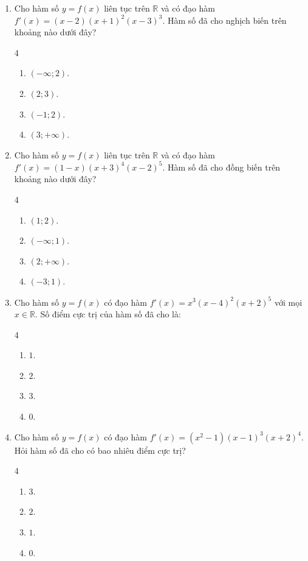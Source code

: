 \documentclass[12pt]{article}
\begin{document}
	\begin{enumerate}[label=\textbf{Câu \arabic*.}]
		
		\item Cho hàm số $y = f(x)$ liên tục trên $\mathbb{R}$ và có đạo hàm $f'(x) = (x - 2)(x + 1)^2(x - 3)^3$. Hàm số đã cho nghịch biến trên khoảng nào dưới đây?
		\begin{multicols}{4}
			\begin{enumerate}[label=\textbf{\Alph*.}]
				\item $(-\infty; 2)$.
				\item $(2; 3)$.
				\item $(-1; 2)$.
				\item $(3; +\infty)$.
			\end{enumerate}
		\end{multicols}
		
		\item Cho hàm số $y = f(x)$ liên tục trên $\mathbb{R}$ và có đạo hàm $f'(x) = (1 - x)(x + 3)^4(x - 2)^5$. Hàm số đã cho đồng biến trên khoảng nào dưới đây?
		\begin{multicols}{4}
			\begin{enumerate}[label=\textbf{\Alph*.}]
				\item $(1; 2)$.
				\item $(-\infty; 1)$.
				\item $(2; +\infty)$.
				\item $(-3; 1)$.
			\end{enumerate}
		\end{multicols}
		
		\item Cho hàm số $y = f(x)$ có đạo hàm $f'(x) = x^3(x - 4)^2(x + 2)^5$ với mọi $x \in \mathbb{R}$. Số điểm cực trị của hàm số đã cho là:
		\begin{multicols}{4}
			\begin{enumerate}[label=\textbf{\Alph*.}]
				\item $1$.
				\item $2$.
				\item $3$.
				\item $0$.
			\end{enumerate}
		\end{multicols}
		
		\item Cho hàm số $y = f(x)$ có đạo hàm $f'(x) = (x^2 - 1)(x - 1)^3(x + 2)^4$. Hỏi hàm số đã cho có bao nhiêu điểm cực trị?
		\begin{multicols}{4}
			\begin{enumerate}[label=\textbf{\Alph*.}]
				\item $3$.
				\item $2$.
				\item $1$.
				\item $0$.
			\end{enumerate}
		\end{multicols}
		

\end{enumerate}
\end{document}
